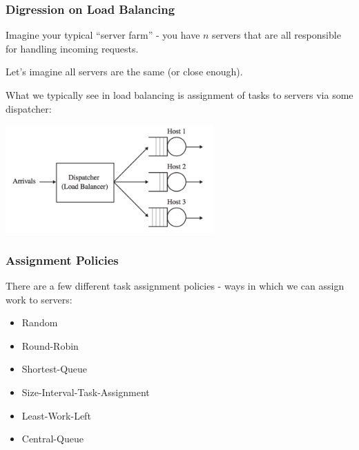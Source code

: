 \begin{frame}
\frametitle{Digression on Load Balancing}

Imagine your typical ``server farm'' - you have $n$ servers that are all responsible for handling incoming requests. 

Let's imagine all servers are the same (or close enough). 

What we typically see in load balancing is assignment of tasks to servers via some dispatcher:

\begin{center}
	\includegraphics[width=0.6\textwidth]{images/central-dispatcher.png}
\end{center}

\end{frame}



\begin{frame}
\frametitle{Assignment Policies}

There are a few different task assignment policies - ways in which we can assign work to servers:

\begin{itemize}
	\item Random
	\item Round-Robin
	\item Shortest-Queue
	\item Size-Interval-Task-Assignment
	\item Least-Work-Left
	\item Central-Queue
\end{itemize}

\end{frame}


